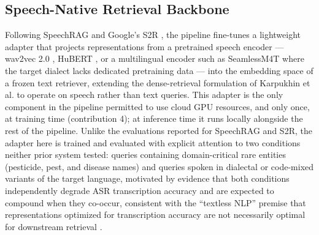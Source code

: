 \documentclass[conference]{IEEEtran}
\begin{document}
\subsection{Speech-Native Retrieval Backbone}
Following SpeechRAG \cite{min2025speechrag} and Google's S2R \cite{google2025s2r}, the pipeline fine-tunes a lightweight adapter that projects representations from a pretrained speech encoder --- wav2vec 2.0 \cite{baevski2020wav2vec}, HuBERT \cite{hsu2021hubert}, or a multilingual encoder such as SeamlessM4T \cite{barrault2023seamlessm4t} where the target dialect lacks dedicated pretraining data --- into the embedding space of a frozen text retriever, extending the dense-retrieval formulation of Karpukhin et al. \cite{karpukhin2020dpr} to operate on speech rather than text queries. This adapter is the only component in the pipeline permitted to use cloud GPU resources, and only once, at training time (contribution 4); at inference time it runs locally alongside the rest of the pipeline. Unlike the evaluations reported for SpeechRAG and S2R, the adapter here is trained and evaluated with explicit attention to two conditions neither prior system tested: queries containing domain-critical rare entities (pesticide, pest, and disease names) and queries spoken in dialectal or code-mixed variants of the target language, motivated by evidence that both conditions independently degrade ASR transcription accuracy \cite{benchmarkingasr2026,dialectmatters2026} and are expected to compound when they co-occur, consistent with the ``textless NLP'' premise that representations optimized for transcription accuracy are not necessarily optimal for downstream retrieval \cite{spidr2025}.
\end{document}
